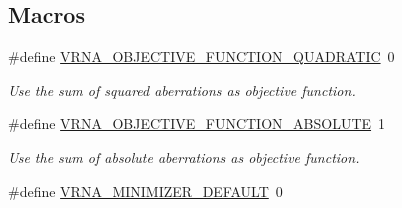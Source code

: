 \subsection*{Macros}
\begin{DoxyCompactItemize}
\item 
\#define \hyperlink{group__perturbation_ga81e10993d1ae728e4e02022b33155a12}{V\+R\+N\+A\+\_\+\+O\+B\+J\+E\+C\+T\+I\+V\+E\+\_\+\+F\+U\+N\+C\+T\+I\+O\+N\+\_\+\+Q\+U\+A\+D\+R\+A\+T\+IC}~0
\begin{DoxyCompactList}\small\item\em Use the sum of squared aberrations as objective function. \end{DoxyCompactList}\item 
\#define \hyperlink{group__perturbation_gac070dfb9cafaeb14d5652bd9adf0f6b1}{V\+R\+N\+A\+\_\+\+O\+B\+J\+E\+C\+T\+I\+V\+E\+\_\+\+F\+U\+N\+C\+T\+I\+O\+N\+\_\+\+A\+B\+S\+O\+L\+U\+TE}~1
\begin{DoxyCompactList}\small\item\em Use the sum of absolute aberrations as objective function. \end{DoxyCompactList}\item 
\#define \hyperlink{group__perturbation_gae5126200d80dbb282f46083fffc606bf}{V\+R\+N\+A\+\_\+\+M\+I\+N\+I\+M\+I\+Z\+E\+R\+\_\+\+D\+E\+F\+A\+U\+LT}~0\hypertarget{group__perturbation_gae5126200d80dbb282f46083fffc606bf}{}\label{group__perturbation_gae5126200d80dbb282f46083fffc606bf}


\end{DoxyCompactItemize}
